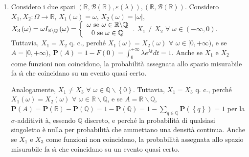 \documentclass{article}
\begin{document}
\begin{enumerate}
\item Considero i due spazi $\left( 
\mathbb{R}
,\mathcal{B}\left( 
\mathbb{R}
\right) ,\varepsilon \left( \lambda \right) \right) ,\left( 
\mathbb{R}
,\mathcal{B}\left( 
\mathbb{R}
\right) \right) $. Considero $X_{1},X_{2}:\Omega \rightarrow 
\mathbb{R}
$, $X_{1}\left( \omega \right) =\omega $, $X_{2}\left( \omega \right)
=\left\vert \omega \right\vert $, $X_{3}\left( \omega \right) =\omega I_{%
\mathbb{R}
\backslash 
\mathbb{Q}
}\left( \omega \right) =\left\{ 
\begin{array}{c}
\omega \text{ se }\omega \in 
\mathbb{R}
\backslash 
\mathbb{Q}
\\ 
0\text{ se }\omega \in 
\mathbb{Q}%
\end{array}%
\right. $. $X_{1}\neq X_{2}$ $\forall $ $\omega \in \left( -\infty ,0\right) 
$. Tuttavia, $X_{1}=X_{2}$ q. c., perch\'{e} $X_{1}\left( \omega \right)
=X_{2}\left( \omega \right) $ $\forall $ $\omega \in \lbrack 0,+\infty )$, e
se $A=[0,+\infty )$, $\mathbf{P}\left( A\right) =1-F\left( 0\right)
=\int_{0}^{+\infty }\lambda e^{\lambda t}dt=1$. Anche se $X_{1}$ e $X_{2}$
come funzioni non coincidono, la probabilit\`{a} assegnata allo spazio
misurabile fa s\`{\i} che coincidano su un evento quasi certo.

Analogamente, $X_{1}\neq X_{3}$ $\forall $ $\omega \in 
\mathbb{Q}
\backslash \left\{ 0\right\} $. Tuttavia, $X_{1}=X_{3}$ q. c., perch\'{e} $%
X_{1}\left( \omega \right) =X_{2}\left( \omega \right) $ $\forall $ $\omega
\in 
\mathbb{R}
\backslash 
\mathbb{Q}
$, e se $A=%
\mathbb{R}
\backslash 
\mathbb{Q}
$, $\mathbf{P}\left( A\right) =\mathbf{P}\left( 
\mathbb{R}
\right) -\mathbf{P}\left( 
\mathbb{Q}
\right) =1-\mathbf{P}\left( 
\mathbb{Q}
\right) =1-\sum_{q\in 
\mathbb{Q}
}\mathbf{P}\left( \left\{ q\right\} \right) =1$ per la $\sigma $-additivit%
\`{a}, essendo $%
\mathbb{Q}
$ discreto, e perch\'{e} la probabilit\`{a} di qualsiasi singoletto \`{e}
nulla per probabilit\`{a} che ammettano una densit\`{a} continua. Anche se $%
X_{1}$ e $X_{3}$ come funzioni non coincidono, la probabilit\`{a} assegnata
allo spazio misurabile fa s\`{\i} che coincidano su un evento quasi certo.


\end{enumerate}
\end{document}
